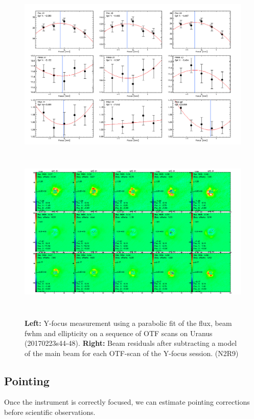 \begin{figure}[h!]
\centering
\includegraphics[height=8cm]{Figures/plot_20170223s44.png}
\hspace{0.5cm}
\includegraphics[height=8cm]{Figures/residuals_focus_otf_20170223s44.png}
\caption[Lateral Y focus measures]{\textbf{Left:} Y-focus measurement using a
    parabolic fit of the flux, beam fwhm and ellipticity on a sequence
    of OTF scans on Uranus (20170223s44-48). \textbf{Right:} Beam residuals
    after subtracting a model of the main beam for each OTF-scan of the Y-focus
    session. (N2R9)}
\label{fig:Y_focus}
\end{figure}


\subsection{Pointing}
\label{se:pointing}

Once the instrument is correctly focused, we can estimate pointing corrections
before scientific observations.

